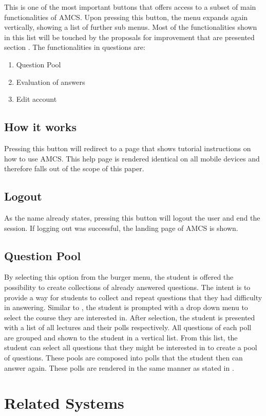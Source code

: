 This is one of the most important buttons that offers access to a subset of main functionalities of AMCS. Upon pressing this button, the menu expands again vertically, showing a list of further sub menus. Most of the functionalities shown in this list will be touched by the proposals for improvement that are presented section \todosct. The functionalities in questions are:

\begin{enumerate}
	\item Question Pool
	\item Evaluation of answers
	\item Edit account
\end{enumerate}


\subsection{How it works}

Pressing this button will redirect to a page that shows tutorial instructions on how to use AMCS.
This help page is rendered identical on all mobile devices and therefore falls out of the scope of this paper.

\subsection{Logout}

As the name already states, pressing this button will logout the user and end the session. 
If logging out was successful, the landing page of AMCS is shown.



\subsection{Question Pool}

By selecting this option from the burger menu, the student is offered the possibility to create collections of already answered questions. The intent is to provide a way for students to collect and repeat questions that they had difficulty in answering.
Similar to \todosct, the student is prompted with a drop down menu to select the course they are interested in. After selection, the student is presented with a list of all lectures and their polls respectively. All questions of each poll are grouped and shown to the student in a vertical list. From this list, the student can select all questions that they might be interested in to create a pool of questions.
These pools are composed into polls that the student then can answer again. These polls are rendered in the same manner as stated in \todosct.


\section{Related Systems}
